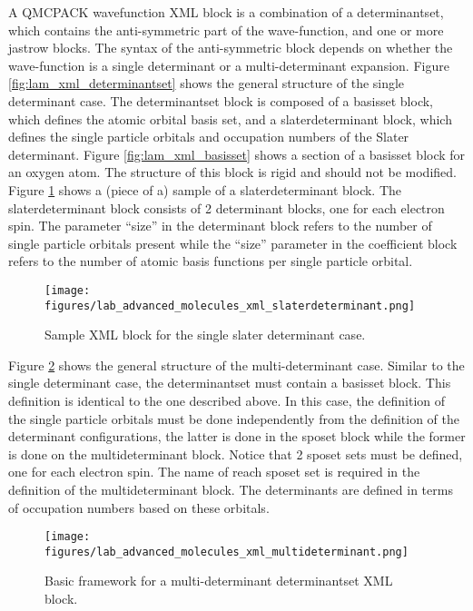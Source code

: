 A QMCPACK wavefunction XML block is a combination of a determinantset, which
contains the anti-symmetric part of the wave-function, and one or more jastrow blocks.
The syntax of the anti-symmetric block depends on whether the wave-function is a single
determinant or a multi-determinant expansion. Figure \ref{fig:lam_xml_determinantset} 
shows the general structure of the
single determinant case. The determinantset block is composed of a basisset block, which
defines the atomic orbital basis set, and a slaterdeterminant block, which defines the single
particle orbitals and occupation numbers of the Slater determinant. Figure \ref{fig:lam_xml_basisset} 
shows a section
of a basisset block for an oxygen atom. The structure of this block is rigid and should not
be modified. Figure \ref{fig:lam_xml_slaterdeterminant} shows a (piece of a) sample of a 
slaterdeterminant block. The
slaterdeterminant block consists of 2 determinant blocks, one for each electron spin. The
parameter “size” in the determinant block refers to the number of single particle orbitals
present while the “size” parameter in the coefficient block refers to the number of atomic
basis functions per single particle orbital.

\begin{figure}[ht!]
\begin{center}
\texttt{[image: figures/lab\_advanced\_molecules\_xml\_slaterdeterminant.png]}
\end{center}
\caption{Sample XML block for the single slater determinant case.
\label{fig:lam_xml_slaterdeterminant}
}
\end{figure}

Figure \ref{fig:lam_xml_multideterminant} shows the general structure of the multi-determinant case. 
Similar to the
single determinant case, the determinantset must contain a basisset block. This definition is
identical to the one described above. In this case, the definition of the single particle orbitals
must be done independently from the definition of the determinant configurations, the latter
is done in the sposet block while the former is done on the multideterminant block. Notice
that 2 sposet sets must be defined, one for each electron spin. The name of reach sposet set
is required in the definition of the multideterminant block. The determinants are defined in
terms of occupation numbers based on these orbitals.

\begin{figure}[ht!]
\begin{center}
\texttt{[image: figures/lab\_advanced\_molecules\_xml\_multideterminant.png]}
\end{center}
\caption{Basic framework for a multi-determinant determinantset XML block.
\label{fig:lam_xml_multideterminant}
}
\end{figure}

